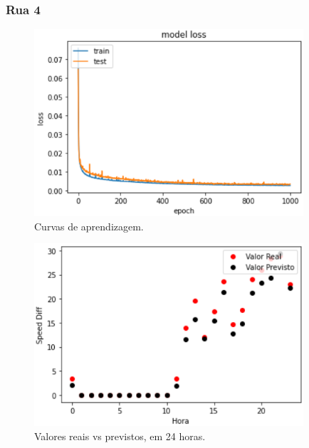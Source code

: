 \documentclass[a4paper, 12pt]{article}
\begin{document}
\subsubsection{Rua 4}


\begin{figure}[H]
	\centering
	\includegraphics[width=10cm]{resultados/curvas_aprend_4.png}
	\caption{Curvas de aprendizagem.}
\end{figure}

\begin{figure}[H]
	\centering
	\includegraphics[width=10cm]{resultados/real_prev_4.png}
	\caption{Valores reais vs previstos, em 24 horas.}
\end{figure}
\end{document}
